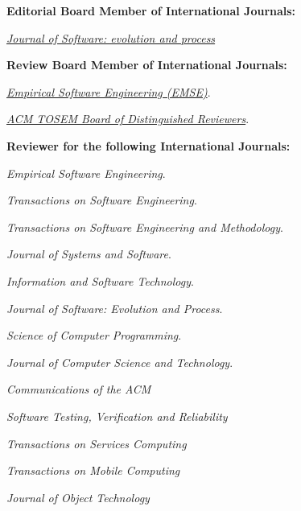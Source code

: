 \documentclass[10pt]{article}
\begin{document}
\textbf{Editorial Board Member of International Journals:}
\begin{innerlist}
\item \emph{\href{http://onlinelibrary.wiley.com/journal/10.1002/(ISSN)2047-7481}{Journal of Software: evolution and process}}
\end{innerlist}

\textbf{Review Board Member of International Journals:}
\begin{innerlist}
   \item \emph{
              \href{}
                   {Empirical Software Engineering (EMSE)}}.
   \item \emph{
              \href{}
                   {ACM TOSEM Board of Distinguished Reviewers}}.\\
\end{innerlist}




\textbf{Reviewer for the following International Journals:}
\begin{innerlist}
\item \emph{Empirical Software Engineering}.
\item \emph{Transactions on Software Engineering}.
\item \emph{ Transactions on Software Engineering and Methodology}.
\item \emph{Journal of Systems and Software}.
\item \emph{Information and Software Technology}.
\item \emph{Journal of Software: Evolution and Process}.
\item \emph{Science of Computer Programming}.
\item \emph{Journal of Computer Science and Technology}.
\item \emph{Communications of the ACM}
\item \emph{Software Testing, Verification and Reliability}
\item \emph{Transactions on Services Computing }
\item \emph{Transactions on Mobile Computing }
\item \emph{Journal of Object Technology}\\
\end{innerlist} 

\end{document}
